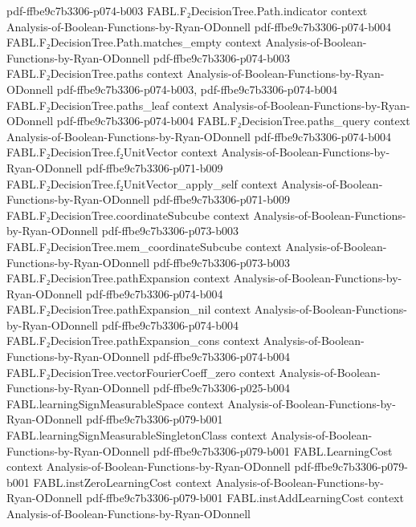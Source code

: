 \begin{theorem}
  {pdf-ffbe9c7b3306-p074-b003}
\proofstep
  {FABL.F₂DecisionTree.Path.indicator}
  {context}
  {Analysis-of-Boolean-Functions-by-Ryan-ODonnell}
  {pdf-ffbe9c7b3306-p074-b004}
\proofstep
  {FABL.F₂DecisionTree.Path.matches_empty}
  {context}
  {Analysis-of-Boolean-Functions-by-Ryan-ODonnell}
  {pdf-ffbe9c7b3306-p074-b003}
\proofstep
  {FABL.F₂DecisionTree.paths}
  {context}
  {Analysis-of-Boolean-Functions-by-Ryan-ODonnell}
  {pdf-ffbe9c7b3306-p074-b003,
    pdf-ffbe9c7b3306-p074-b004}
\proofstep
  {FABL.F₂DecisionTree.paths_leaf}
  {context}
  {Analysis-of-Boolean-Functions-by-Ryan-ODonnell}
  {pdf-ffbe9c7b3306-p074-b004}
\proofstep
  {FABL.F₂DecisionTree.paths_query}
  {context}
  {Analysis-of-Boolean-Functions-by-Ryan-ODonnell}
  {pdf-ffbe9c7b3306-p074-b004}
\proofstep
  {FABL.F₂DecisionTree.f₂UnitVector}
  {context}
  {Analysis-of-Boolean-Functions-by-Ryan-ODonnell}
  {pdf-ffbe9c7b3306-p071-b009}
\proofstep
  {FABL.F₂DecisionTree.f₂UnitVector_apply_self}
  {context}
  {Analysis-of-Boolean-Functions-by-Ryan-ODonnell}
  {pdf-ffbe9c7b3306-p071-b009}
\proofstep
  {FABL.F₂DecisionTree.coordinateSubcube}
  {context}
  {Analysis-of-Boolean-Functions-by-Ryan-ODonnell}
  {pdf-ffbe9c7b3306-p073-b003}
\proofstep
  {FABL.F₂DecisionTree.mem_coordinateSubcube}
  {context}
  {Analysis-of-Boolean-Functions-by-Ryan-ODonnell}
  {pdf-ffbe9c7b3306-p073-b003}
\proofstep
  {FABL.F₂DecisionTree.pathExpansion}
  {context}
  {Analysis-of-Boolean-Functions-by-Ryan-ODonnell}
  {pdf-ffbe9c7b3306-p074-b004}
\proofstep
  {FABL.F₂DecisionTree.pathExpansion_nil}
  {context}
  {Analysis-of-Boolean-Functions-by-Ryan-ODonnell}
  {pdf-ffbe9c7b3306-p074-b004}
\proofstep
  {FABL.F₂DecisionTree.pathExpansion_cons}
  {context}
  {Analysis-of-Boolean-Functions-by-Ryan-ODonnell}
  {pdf-ffbe9c7b3306-p074-b004}
\proofstep
  {FABL.F₂DecisionTree.vectorFourierCoeff_zero}
  {context}
  {Analysis-of-Boolean-Functions-by-Ryan-ODonnell}
  {pdf-ffbe9c7b3306-p025-b004}
\proofstep
  {FABL.learningSignMeasurableSpace}
  {context}
  {Analysis-of-Boolean-Functions-by-Ryan-ODonnell}
  {pdf-ffbe9c7b3306-p079-b001}
\proofstep
  {FABL.learningSignMeasurableSingletonClass}
  {context}
  {Analysis-of-Boolean-Functions-by-Ryan-ODonnell}
  {pdf-ffbe9c7b3306-p079-b001}
\proofstep
  {FABL.LearningCost}
  {context}
  {Analysis-of-Boolean-Functions-by-Ryan-ODonnell}
  {pdf-ffbe9c7b3306-p079-b001}
\proofstep
  {FABL.instZeroLearningCost}
  {context}
  {Analysis-of-Boolean-Functions-by-Ryan-ODonnell}
  {pdf-ffbe9c7b3306-p079-b001}
\proofstep
  {FABL.instAddLearningCost}
  {context}
  {Analysis-of-Boolean-Functions-by-Ryan-ODonnell}

\end{theorem}
